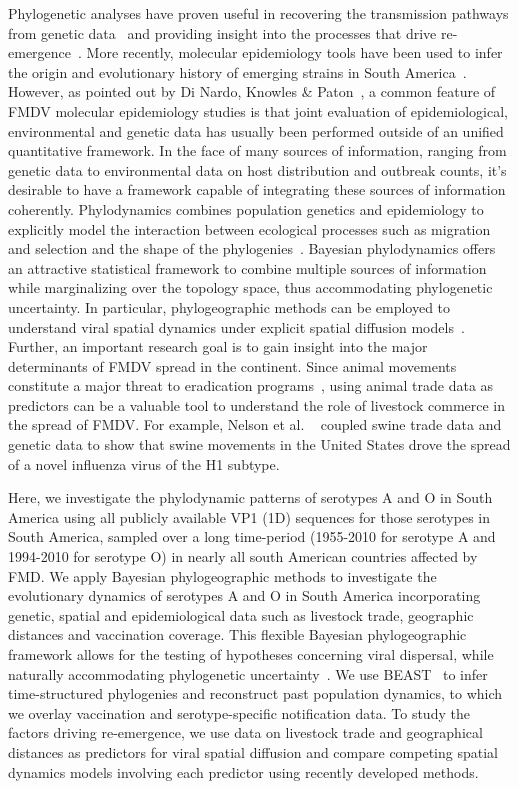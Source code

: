 \documentclass[10pt]{article}
\begin{document}
Phylogenetic analyses have proven useful in recovering the transmission pathways from genetic data~\citep{Cottam2008a, Cottam2008b} and providing insight into the processes that drive re-emergence~\citep{DiNardo2011}.
More recently, molecular epidemiology tools have been used to infer the origin and evolutionary history of emerging strains in South America~\citep{Perez2001, Malirat2007, Malirat2011a, Malirat2011b, Maradei2013}.
However, as pointed out by Di Nardo, Knowles \& Paton~\citep{DiNardo2011}, a common feature of FMDV molecular epidemiology studies is that  joint evaluation of epidemiological, environmental and genetic data has usually been performed outside of an unified quantitative framework.
In the face of many sources of information, ranging from genetic data to environmental data on host distribution and outbreak counts, it's desirable to have a framework capable of integrating these sources of information coherently.
Phylodynamics combines population genetics and epidemiology to explicitly  model the interaction between ecological processes such as migration and selection and the shape of the phylogenies~\citep{Grenfell2004, Volz2013}.
Bayesian phylodynamics offers an attractive statistical framework to combine multiple sources of information while marginalizing over the topology space, thus accommodating phylogenetic uncertainty.
In particular, phylogeographic methods can be employed to understand viral spatial dynamics under explicit spatial diffusion models~\citep{Lemey2009}.
Further, an important research goal is to gain insight into the major determinants of FMDV spread in the continent.
Since animal movements constitute a major threat to eradication programs~\citep{Schley2009}, using animal trade data as predictors can be a valuable tool to understand the role of livestock commerce in the spread of FMDV.
For example, Nelson et al. ~\citep{Nelson2011} coupled swine trade data and genetic data to show that swine movements in the United States drove the spread of a novel influenza virus of the H1 subtype.

Here, we investigate the phylodynamic patterns of serotypes A and O in South America using all publicly available VP1 (1D) sequences for those serotypes in South America, sampled over a long time-period (1955-2010 for serotype A and 1994-2010 for serotype O) in nearly all south American countries affected by FMD.
We apply Bayesian phylogeographic methods to investigate the evolutionary dynamics of serotypes A and O in South America incorporating  genetic, spatial and epidemiological data such as livestock trade, geographic distances and vaccination coverage.
This flexible Bayesian phylogeographic framework allows for the testing of hypotheses concerning viral dispersal, while naturally accommodating phylogenetic uncertainty~\citep{Lemey2009, Faria2011}.
We use BEAST~\citep{Drummond2012} to infer time-structured phylogenies and reconstruct past population dynamics, to which we overlay vaccination and serotype-specific notification data.
To study the factors driving re-emergence, we use data on livestock trade and geographical distances as predictors for viral spatial diffusion and compare competing spatial dynamics models involving each predictor using recently developed methods. 
\end{document}
